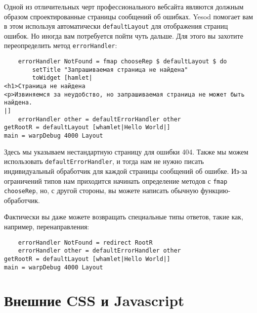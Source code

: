 Одной из отличительных черт профессионального вебсайта являются должным образом спроектированные страницы сообщений об ошибках. Yesod помогает вам в этом используя автоматически \lstinline!defaultLayout! для отображения страниц ошибок. Но иногда вам потребуется пойти чуть дальше. Для этого вы захотите переопределить метод \lstinline!errorHandler!:

\begin{lstlisting}
    errorHandler NotFound = fmap chooseRep $ defaultLayout $ do
        setTitle "Запрашиваемая страница не найдена"
        toWidget [hamlet|
<h1>Страница не найдена
<p>Извиняемся за неудобство, но запрашиваемая страница не может быть найдена.
|]
    errorHandler other = defaultErrorHandler other
getRootR = defaultLayout [whamlet|Hello World|]
main = warpDebug 4000 Layout
\end{lstlisting}

Здесь мы указываем нестандартную страницу для ошибки 404. Также мы можем использовать \lstinline!defaultErrorHandler!, и тогда нам не нужно писать индивидуальный обработчик для каждой страницы сообщений об ошибке. Из-за ограничений типов нам приходится начинать определение методов с \lstinline!fmap chooseRep!, но, с другой стороны, вы можете написать обычную функцию-обработчик.

Фактически вы даже можете возвращать специальные типы ответов, такие как, например, перенаправления:

\begin{lstlisting}
    errorHandler NotFound = redirect RootR
    errorHandler other = defaultErrorHandler other
getRootR = defaultLayout [whamlet|Hello World|]
main = warpDebug 4000 Layout
\end{lstlisting}


\section {Внешние CSS и Javascript}


